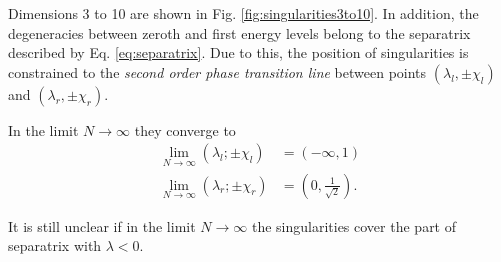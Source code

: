 Dimensions 3 to 10 are shown in Fig. \ref{fig:singularities3to10}.
In addition, the degeneracies between zeroth and first energy levels belong to the separatrix described by Eq. \ref{eq:separatrix}. Due to this, the position of singularities is constrained to the \emph{second order phase transition line} between points $(\lambda_l,\pm\chi_l)$ and $(\lambda_r,\pm\chi_r)$.



In the limit $N\rightarrow\infty$ they converge to
\begin{align*}
    \lim_{N\rightarrow \infty}(\lambda_l ;\pm\chi_l)&= \left(-\infty,1\right)\\
    \lim_{N\rightarrow \infty}(\lambda_r ;\pm\chi_r)&= \left(0,\frac{1}{\sqrt{2}}\right).
\end{align*}

It is still unclear if in the limit $N\rightarrow \infty$ the singularities cover the part of separatrix with $\lambda<0$.

